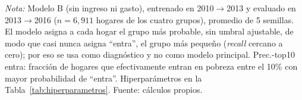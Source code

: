 \begin{table}[H]
  \centering
  \caption{Desempeño del modelo multiclase (cuatro grupos) en el conjunto de prueba.}
  \label{tab:multiclase_metricas}
  \footnotesize
  \setlength{\tabcolsep}{4pt}
  \begin{minipage}{0.95\textwidth}
    \vspace{4pt}
    \footnotesize \textit{Nota:} Modelo B (sin ingreso ni gasto), entrenado en 2010$\to$2013 y evaluado en 2013$\to$2016 ($n=6{,}911$ hogares de los cuatro grupos), promedio de 5 semillas. El modelo asigna a cada hogar el grupo más probable, sin umbral ajustable, de modo que casi nunca asigna ``entra'', el grupo más pequeño (\emph{recall} cercano a cero); por eso se usa como diagnóstico y no como modelo principal. Prec.-top10 entra: fracción de hogares que efectivamente entran en pobreza entre el 10\% con mayor probabilidad de ``entra''. Hiperparámetros en la Tabla~\ref{tab:hiperparametros}. Fuente: cálculos propios.
  \end{minipage}
\end{table}
